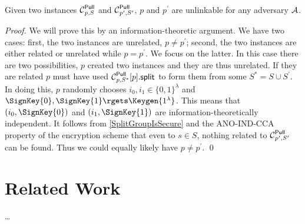 \begin{theorem}
  Given two instances \(\Pull[p, S]\) and \(\Pull[p^\prime, S^\prime]\), \(p\) 
  and \(p^\prime\) are unlinkable for any adversary \(\A\).
\end{theorem}

\begin{proof}
  We will prove this by an information-theoretic argument.
  We have two cases: first, the two instances are unrelated, \(p\neq 
    p^\prime\); second, the two instances are either related or unrelated while 
  \(p = p^\prime\).
  We focus on the latter.
  In this case there are two possibilities, \(p\) created two instances and 
  they are thus unrelated.
  If they are related \(p\) must have used \(\psplit[p, S^*]{p}\) to form them 
  from some \(S^* = S\cup S^\prime\).
  In doing this, \(p\) randomly chooses \(i_0, i_1\in \{0, 1\}^\lambda\) and 
  \(\SignKey{0}, \SignKey{1}\rgets \Keygen{1^\lambda}\).
  This means that \((i_0, \SignKey{0})\) and \((i_1, \SignKey{1})\) are 
  information-theoretically independent.
  It follows from \cref{SplitGroupIsSecure} and the ANO-IND-CCA property of the 
  encryption scheme that even to \(s\in S\), nothing related to 
  \(\Pull[p^\prime, S^\prime]\) can be found.
  Thus we could equally likely have \(p\neq p^\prime\).
  \qed{}
\end{proof}


\section{Related Work}

\dots


